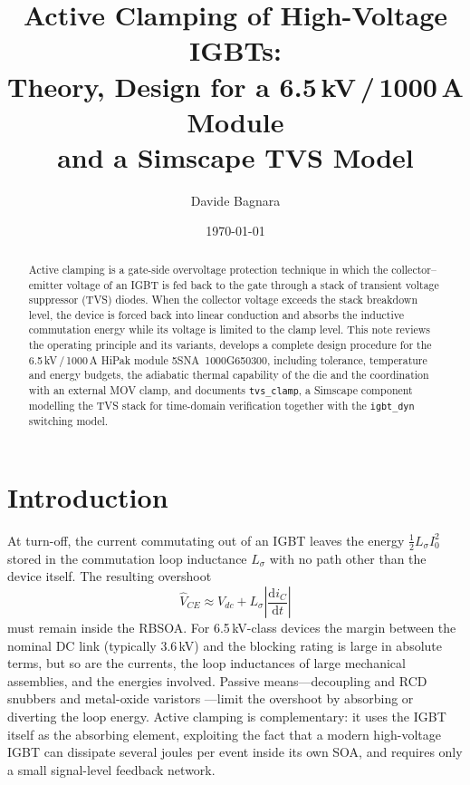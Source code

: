 \documentclass[11pt,a4paper]{article}
\title{Active Clamping of High-Voltage IGBTs:\\
Theory, Design for a 6.5\,kV\,/\,1000\,A Module\\
and a Simscape TVS Model}
\author{Davide Bagnara}
\date{\today}
\newcommand{\ud}{\mathrm{d}}
\begin{document}
\maketitle

\begin{abstract}
Active clamping is a gate-side overvoltage protection technique in which
the collector--emitter voltage of an IGBT is fed back to the gate through
a stack of transient voltage suppressor (TVS) diodes. When the collector
voltage exceeds the stack breakdown level, the device is forced back into
linear conduction and absorbs the inductive commutation energy while its
voltage is limited to the clamp level. This note reviews the operating
principle and its variants, develops a complete design procedure for the
6.5\,kV\,/\,1000\,A HiPak module 5SNA~1000G650300, including tolerance,
temperature and energy budgets, the adiabatic thermal capability of the
die and the coordination with an external MOV clamp, and documents \texttt{tvs\_clamp}, a Simscape component modelling
the TVS stack for time-domain verification together with the
\texttt{igbt\_dyn} switching model.
\end{abstract}

\tableofcontents

\section{Introduction}

At turn-off, the current commutating out of an IGBT leaves the energy
$\tfrac{1}{2}L_\sigma I_0^2$ stored in the commutation loop inductance
$L_\sigma$ with no path other than the device itself. The resulting
overshoot
%
\begin{equation}
  \hat{V}_{CE} \approx V_{dc} + L_\sigma \left|\frac{\ud i_C}{\ud t}\right|
  \label{eq:overshoot}
\end{equation}
%
must remain inside the RBSOA. For 6.5\,kV-class devices the margin
between the nominal DC link (typically 3.6\,kV) and the blocking rating
is large in absolute terms, but so are the currents, the loop
inductances of large mechanical assemblies, and the energies involved.
Passive means---decoupling and RCD snubbers \cite{snubdes,snubpar} and
metal-oxide varistors \cite{movnote}---limit the overshoot by absorbing
or diverting the loop energy. Active clamping is complementary: it uses
the IGBT itself as the absorbing element, exploiting the fact that a
modern high-voltage IGBT can dissipate several joules per event inside
its own SOA, and requires only a small signal-level feedback network.
\end{document}
